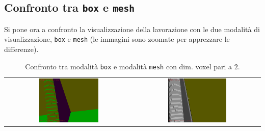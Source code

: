 \subsection{Confronto tra \texttt{box} e \texttt{mesh}}
Si pone ora a confronto la visualizzazione della lavorazione con le due modalità di visualizzazione, \texttt{box} e \texttt{mesh} (le immagini sono zoomate per apprezzare le differenze).
\begin{center}
\begin{table}[hbtp]
  \begin{tabular}{cc}
   \includegraphics[width=0.48\textwidth]{img/screenshots/pos2_box_v2_2.png} &%
   \includegraphics[width=0.48\textwidth]{img/screenshots/pos2_mesh_v2_2.png}\\
  \end{tabular}
  \caption{Confronto tra modalità \texttt{box} e modalità \texttt{mesh} con dim. voxel pari a $2$.}
  \label{tab:confrontobm1}
\end{table}
\end{center}

